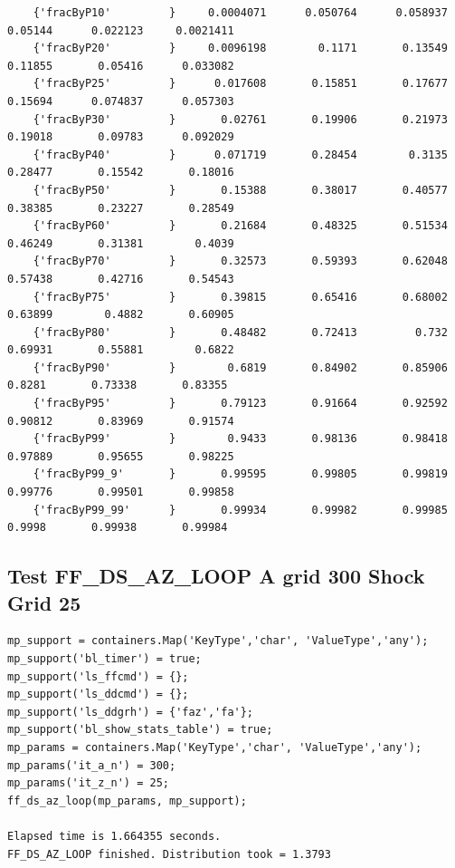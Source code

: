 \documentclass[
]{book}
\begin{document}
\begin{verbatim}
    {'fracByP10'         }     0.0004071      0.050764      0.058937       0.05144      0.022123     0.0021411 
    {'fracByP20'         }     0.0096198        0.1171       0.13549       0.11855       0.05416      0.033082 
    {'fracByP25'         }      0.017608       0.15851       0.17677       0.15694      0.074837      0.057303 
    {'fracByP30'         }       0.02761       0.19906       0.21973       0.19018       0.09783      0.092029 
    {'fracByP40'         }      0.071719       0.28454        0.3135       0.28477       0.15542       0.18016 
    {'fracByP50'         }       0.15388       0.38017       0.40577       0.38385       0.23227       0.28549 
    {'fracByP60'         }       0.21684       0.48325       0.51534       0.46249       0.31381        0.4039 
    {'fracByP70'         }       0.32573       0.59393       0.62048       0.57438       0.42716       0.54543 
    {'fracByP75'         }       0.39815       0.65416       0.68002       0.63899        0.4882       0.60905 
    {'fracByP80'         }       0.48482       0.72413         0.732       0.69931       0.55881        0.6822 
    {'fracByP90'         }        0.6819       0.84902       0.85906        0.8281       0.73338       0.83355 
    {'fracByP95'         }       0.79123       0.91664       0.92592       0.90812       0.83969       0.91574 
    {'fracByP99'         }        0.9433       0.98136       0.98418       0.97889       0.95655       0.98225 
    {'fracByP99_9'       }       0.99595       0.99805       0.99819       0.99776       0.99501       0.99858 
    {'fracByP99_99'      }       0.99934       0.99982       0.99985        0.9998       0.99938       0.99984 
\end{verbatim}

\hypertarget{test-ff_ds_az_loop-a-grid-300-shock-grid-25}{%
\subsection{Test FF\_DS\_AZ\_LOOP A grid 300 Shock Grid 25}\label{test-ff_ds_az_loop-a-grid-300-shock-grid-25}}

\begin{verbatim}
mp_support = containers.Map('KeyType','char', 'ValueType','any');
mp_support('bl_timer') = true;
mp_support('ls_ffcmd') = {};
mp_support('ls_ddcmd') = {};
mp_support('ls_ddgrh') = {'faz','fa'};
mp_support('bl_show_stats_table') = true;
mp_params = containers.Map('KeyType','char', 'ValueType','any');
mp_params('it_a_n') = 300;
mp_params('it_z_n') = 25;
ff_ds_az_loop(mp_params, mp_support);

Elapsed time is 1.664355 seconds.
FF_DS_AZ_LOOP finished. Distribution took = 1.3793
\end{verbatim}
\end{document}
